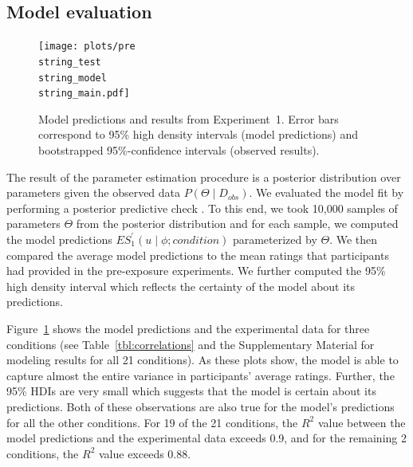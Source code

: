 \documentclass[man, floatsintext]{apa6}
\begin{document}
\subsection{Model evaluation}



\begin{figure}[th!]
\texttt{[image: plots/pre\\string\_test\\string\_model\\string\_main.pdf]}
\caption{Model predictions and results from Experiment~1. Error bars correspond to 95\% high density intervals (model predictions) and bootstrapped 95\%-confidence intervals (observed results). \label{fig:norming-results-model-main}}

\end{figure}


The result of the parameter estimation procedure is a posterior distribution over parameters given the observed data $P(\Theta \mid D_{obs})$. We evaluated
the model fit by performing a posterior predictive check \parencite[PPC;][]{Kruschke2015}. To this end, we took 10,000 samples of parameters $\Theta$ from the posterior distribution
and for each sample, we computed the model predictions $ES_{1}^{'}(u \mid \phi; condition)$ parameterized by $\Theta$. We then compared the average model predictions to the
mean ratings that participants had provided in the pre-exposure experiments. We further computed the 95\% high density interval  \parencite[HDI;][]{Kruschke2015} which reflects the certainty of the model
about its predictions.

Figure~\ref{fig:norming-results-model-main} shows the model predictions and the experimental data for three conditions 
(see Table~\ref{tbl:correlations} and the Supplementary Material for modeling results for all 21 conditions). As these plots show, the model
is able to capture almost the entire variance in participants' average ratings. Further, the 95\% HDIs are very small which suggests
that the model is certain about its predictions. Both of these observations are also true for the model's predictions for all the other
conditions. For 19 of the 21 conditions, the $R^2$ value between the model predictions and the experimental data exceeds 0.9,
and for the remaining 2 conditions, the $R^2$ value exceeds 0.88. 
\end{document}

